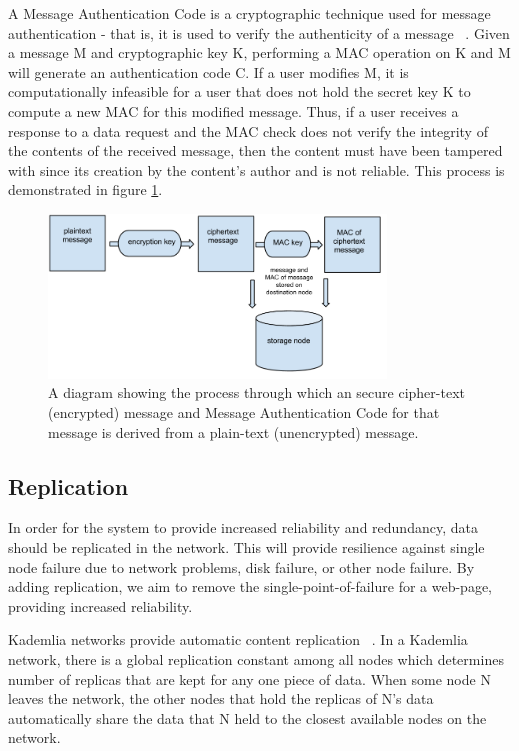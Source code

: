 A Message Authentication Code is a cryptographic technique used for message authentication - that is, it is used to verify
the authenticity of a message ~\cite{hmac}. Given a message M and cryptographic key K, performing a MAC operation on K and
M will generate an authentication code C. If a user modifies M, it is computationally infeasible for a user that does not
hold the secret key K to compute a new MAC for this modified message. Thus, if a user receives a response to a data request and
the MAC check does not verify the integrity of the contents of the received message, then the content must have been tampered
with since its creation by the content's author and is not reliable. This process is demonstrated in figure \ref{fig:hmac}.

\begin{figure}[H]
    \centering
    \includegraphics[width=0.8\textwidth]{img/mac.png}
    \caption{A diagram showing the process through which an secure cipher-text (encrypted) message and Message
    Authentication Code for that message is derived from a plain-text (unencrypted) message.}
    \label{fig:hmac}
\end{figure}


\subsection{Replication}

In order for the system to provide increased reliability and redundancy, data should be
replicated in the network. This will provide resilience against single node failure due to network problems,
disk failure, or other node failure. By adding replication, we aim to remove the single-point-of-failure for a
web-page, providing increased reliability.

Kademlia networks provide automatic content replication ~\cite{kademlia}. In a Kademlia network, there is a
global replication constant among all nodes which determines number of replicas that are kept for any
one piece of data. When some node N leaves the network, the other nodes that hold the replicas of N's data
automatically share the data that N held to the closest available nodes on the network.

